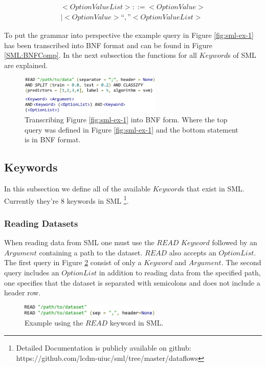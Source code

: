 \documentclass[jair,twoside,11pt,theapa]{article}
\begin{document}
\begin{equation} \label{BNF:OptionValueList}
\begin{split}
<Option Value List> ::= <Option Value> \\
| <Option Value> “,” <Option Value List>
\end{split}
\end{equation}

To put the grammar into perspective the example query in Figure \ref{fig:sml-ex-1} has been transcribed into BNF format and can be found in Figure \ref{SML:BNFComp}. In the next subsection the functions for all  \(Keyword\)s of SML are explained.


\begin{figure}
\includegraphics[width=0.6\textwidth]{figs/bnf_ex.png}
\centering
\caption{Transcribing Figure \ref{fig:sml-ex-1} into BNF form. Where the top query was defined in Figure \ref{fig:sml-ex-1} and the bottom statement is in BNF format.}
\label{fig:SML:BNFComp}
\end{figure}


\subsection{Keywords}
In this subsection we define all of the available \(Keyword\)s that exist in SML. Currently they're 8 keywords in SML \footnote{Detailed Documentation is publicly available on github: https://github.com/lcdm-uiuc/sml/tree/master/dataflows}.

\subsubsection{Reading Datasets}
When reading data from SML one must use the \(READ\) \(Keyword\) followed by an \(Argument\) containing a path to the dataset. \(READ\) also accepts an \(OptionList\). The first query in Figure \ref{fig:SML:READ} consist of only a \(Keyword\) and \(Argument\). The second query includes an \(OptionList\) in addition to reading data from the specified path, one specifies that the dataset is separated with semicolons and does not include a header row. 

\begin{figure}
\includegraphics[width=0.6\textwidth]{figs/READ.png}
\centering
\caption{Example using the \(READ\) keyword in SML.}
\label{fig:SML:READ}
\end{figure}
\end{document}
